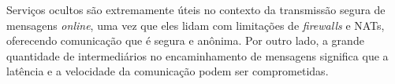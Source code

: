 Serviços ocultos são extremamente úteis no contexto da transmissão segura de mensagens \textit{online}, uma vez que eles lidam com limitações de \textit{firewalls} e NATs, oferecendo comunicação que é segura e anônima. Por outro lado, a grande quantidade de intermediários no encaminhamento de mensagens significa que a latência e a velocidade da comunicação podem ser comprometidas.